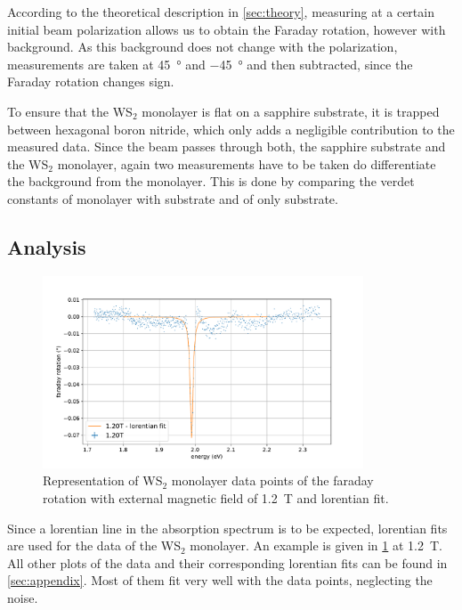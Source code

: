 According to the theoretical description in \cref{sec:theory}, measuring at a certain initial beam polarization allows us to obtain the Faraday rotation, however with background.
As this background does not change with the polarization, measurements are taken at \SI{+45}{\degree} and \SI{-45}{\degree} and then subtracted, since the Faraday rotation changes sign.

To ensure that the WS$_2$ monolayer is flat on a sapphire substrate, it is trapped between hexagonal boron nitride, which only adds a negligible contribution to the measured data.
Since the beam passes through both, the sapphire substrate and the WS$_2$ monolayer, again two measurements have to be taken do differentiate the background from the monolayer.
This is done by comparing the verdet constants of monolayer with substrate and of only substrate.

\subsection{Analysis}

\begin{figure}[!ht]
    \centering
    \includegraphics[width=0.85\textwidth]{plots/WS2_1200mT.pdf}
    \caption{Representation of WS$_2$ monolayer data points of the faraday rotation with external magnetic field of \SI{1.2}{\tesla} and lorentian fit.}
    \label{fig_WS2_1200mT}
\end{figure}
Since a lorentian line in the absorption spectrum is to be expected, lorentian fits are used for the data of the WS$_2$ monolayer.
An example is given in \cref{fig_WS2_1200mT} at \SI{1.2}{\tesla}.
All other plots of the data and their corresponding lorentian fits can be found in \cref{sec:appendix}.
Most of them fit very well with the data points, neglecting the noise.


